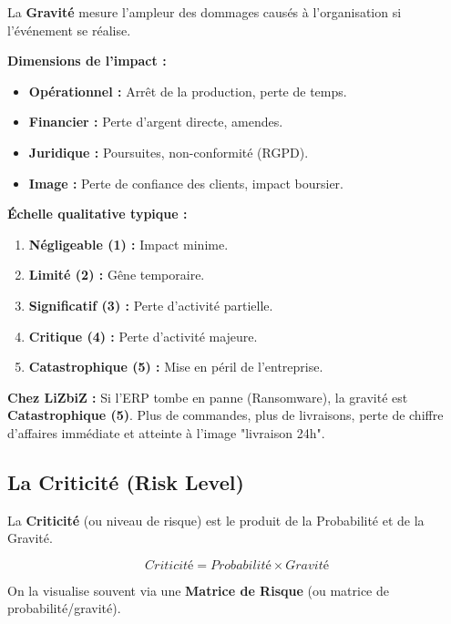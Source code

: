 La \textbf{Gravité} mesure l'ampleur des dommages causés à l'organisation si l'événement se réalise.

\textbf{Dimensions de l'impact :}
\begin{itemize}
    \item \textbf{Opérationnel :} Arrêt de la production, perte de temps.
    \item \textbf{Financier :} Perte d'argent directe, amendes.
    \item \textbf{Juridique :} Poursuites, non-conformité (RGPD).
    \item \textbf{Image :} Perte de confiance des clients, impact boursier.
\end{itemize}

\textbf{Échelle qualitative typique :}
\begin{enumerate}
    \item \textbf{Négligeable (1) :} Impact minime.
    \item \textbf{Limité (2) :} Gêne temporaire.
    \item \textbf{Significatif (3) :} Perte d'activité partielle.
    \item \textbf{Critique (4) :} Perte d'activité majeure.
    \item \textbf{Catastrophique (5) :} Mise en péril de l'entreprise.
\end{enumerate}

\begin{boxlizbiz}
\textbf{Chez LiZbiZ :} Si l'ERP tombe en panne (Ransomware), la gravité est \textbf{Catastrophique (5)}. Plus de commandes, plus de livraisons, perte de chiffre d'affaires immédiate et atteinte à l'image "livraison 24h".
\end{boxlizbiz}

\subsection{La Criticité (Risk Level)}

La \textbf{Criticité} (ou niveau de risque) est le produit de la Probabilité et de la Gravité.

\[ Criticité = Probabilité \times Gravité \]

On la visualise souvent via une \textbf{Matrice de Risque} (ou matrice de probabilité/gravité).

